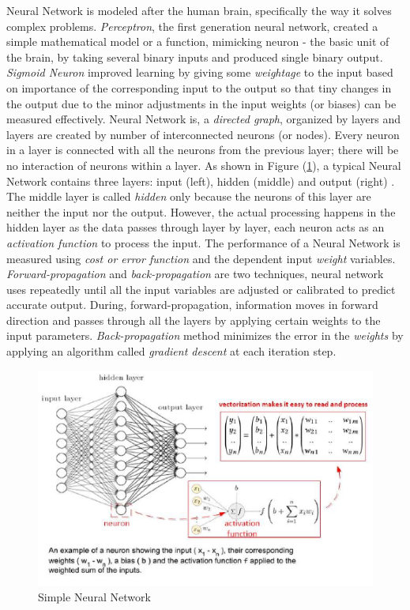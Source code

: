 \documentclass[sigconf]{acmart}
\begin{document}
	Neural Network is modeled after the human brain, specifically the way it solves complex problems. {\em Perceptron}, the first generation neural network, created a simple mathematical model or a function, mimicking neuron - the basic unit of the brain, by taking several binary inputs and produced single binary output. {\em Sigmoid Neuron} improved learning by giving some {\em weightage} to the input based on importance of the corresponding input to the output so that tiny changes in the output due to the minor adjustments in the input weights (or biases) can be measured effectively. Neural Network is, a {\em directed graph}, organized by layers and layers are created by number of interconnected neurons (or nodes). Every neuron in a layer is connected with all the neurons from the previous layer; there will be no interaction of neurons within a layer. As shown in Figure (\ref{fig:figure1}), a typical Neural Network contains three layers: input (left), hidden (middle) and output (right) \cite{Goodfellow2016}. The middle layer is called {\em hidden} only because the neurons of this layer are neither the input nor the output. However, the actual processing happens in the hidden layer as the data passes through layer by layer, each neuron acts as an {\em activation function} to process the input. The performance of a Neural Network is measured using {\em cost or error function} and the dependent input {\em weight} variables. {\em Forward-propagation} and {\em back-propagation} are two techniques, neural network uses repeatedly until all the input variables are adjusted or calibrated to predict accurate output. During, forward-propagation, information moves in forward direction and passes through all the layers by applying certain weights to the input parameters. {\em Back-propagation} method minimizes the error in the {\em weights} by applying an algorithm called {\em gradient descent} at each iteration step. 	


	\begin{figure}
		\centering
		\includegraphics[width=1.0\columnwidth]{images/neuralnetwork}
		\caption{Simple Neural Network \cite{Goodfellow2016, Gupta2017}} \label{fig:figure1} 
	\end{figure}
\end{document}
